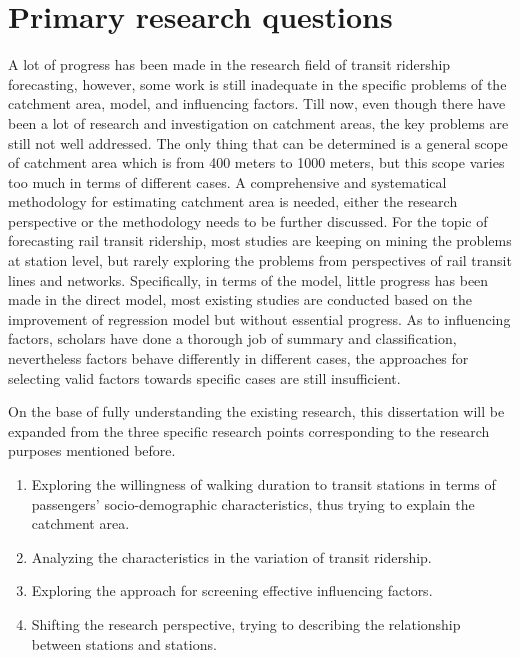 %
\section{Primary research questions}
A lot of progress has been made in the research field of transit ridership forecasting, however, some work is still inadequate in the specific problems of the catchment area, model, and influencing factors. Till now, even though there have been a lot of research and investigation on catchment areas, the key problems are still not well addressed. The only thing that can be determined is a general scope of catchment area which is from 400 meters to 1000 meters, but this scope varies too much in terms of different cases. A comprehensive and systematical methodology for estimating catchment area is needed, either the research perspective or the methodology needs to be further discussed. For the topic of forecasting rail transit ridership, most studies are keeping on mining the problems at station level, but rarely exploring the problems from perspectives of rail transit lines and networks. Specifically, in terms of the model, little progress has been made in the direct model, most existing studies are conducted based on the improvement of regression model but without essential progress. As to influencing factors, scholars have done a thorough job of summary and classification, nevertheless factors behave differently in different cases, the approaches for selecting valid factors towards specific cases are still insufficient. 

On the base of fully understanding the existing research, this dissertation will be expanded from the three specific research points corresponding to the research purposes mentioned before.

\begin{enumerate}
	\setlength{\parskip}{0\baselineskip} %
	\item Exploring the willingness of walking duration to transit stations in terms of passengers' socio-demographic characteristics, thus trying to explain the catchment area.
	\item Analyzing the characteristics in the variation of transit ridership.
	\item Exploring the approach for screening effective influencing factors.
	\item Shifting the research perspective, trying to describing the relationship between stations and stations.
	\setlength{\parskip}{0.7\baselineskip} %
\end{enumerate}

